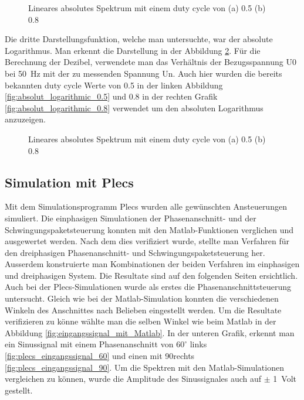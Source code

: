 \begin{figure}[ht!]
	\centering
	\qquad
	\caption{Lineares absolutes Spektrum mit einem duty cycle von (a) 0.5 (b) 0.8}
	\label{fig:Schwingungspaketspektrum Matlab}
\end{figure}

Die dritte Darstellungsfunktion, welche man untersuchte, war der absolute Logarithmus. Man erkennt die Darstellung in der Abbildung \ref{fig:absolut_logaritmic_matlab}. Für die Berechnung der Dezibel, verwendete man das Verhältnis der Bezugsspannung U0 bei \SI{50}{Hz} mit der zu messenden Spannung Un. Auch hier wurden die bereits bekannten duty cycle Werte von 0.5 in der linken Abbildung  \ref{fig:absolut_logarithmic_0.5} und 0.8 in der rechten Grafik \ref{fig:absolut_logarithmic_0.8} verwendet um den absoluten Logarithmus anzuzeigen.



\begin{figure}[ht!]
	\centering
	\qquad
	\caption{Lineares absolutes Spektrum mit einem duty cycle von (a) 0.5 (b) 0.8}
	\label{fig:absolut_logaritmic_matlab}
\end{figure}
\newpage
\subsection{Simulation mit Plecs}

Mit dem Simulationsprogramm Plecs wurden alle gewünschten Ansteuerungen simuliert. Die einphasigen Simulationen der Phasenanschnitt- und der Schwingungspaketsteuerung konnten mit den Matlab-Funktionen verglichen und ausgewertet werden. Nach dem dies verifiziert wurde, stellte man Verfahren für den dreiphasigen Phasenanschnitt- und Schwingungspaketsteuerung her. Ausserdem konstruierte man Kombinationen der beiden Verfahren im einphasigen und dreiphasigen System. Die Resultate sind auf den folgenden Seiten ersichtlich.\\



Auch bei der Plecs-Simulationen wurde als erstes die Phasenanschnittsteuerung untersucht. Gleich wie bei der Matlab-Simulation konnten die verschiedenen Winkeln des Anschnittes nach Belieben eingestellt werden. Um die Resultate verifizieren zu könne wählte man die selben Winkel wie beim Matlab in der Abbildung \ref{fig:eingangssignal_mit_Matlab}. In der unteren Grafik, erkennt man ein Sinussignal mit einem Phasenanschnitt von $60^\circ$ links \ref{fig:plecs_eingangssignal_60} und einen mit 90\textdegree rechts \ref{fig:plecs_eingangssignal_90}. Um die Spektren mit den Matlab-Simulationen vergleichen zu können, wurde die Amplitude des Sinussignales auch auf $\pm$ \SI{1}{Volt} gestellt.  

